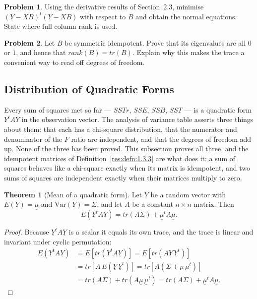 \documentclass[11pt,a4paper]{article}
\theoremstyle{definition}
\newtheorem{thm}{Theorem}[subsection]
\newtheorem{problemx}{Problem}[section]
\newenvironment{problem}{\begin{problemx}}{\end{problemx}}
\begin{document}
\begin{problem}
Using the derivative results of Section~2.3, minimise
$\left(\underline{Y}-XB\right)^t\left(\underline{Y}-XB\right)$ with respect to
$B$ and obtain the normal equations. State where full column rank is used.
\end{problem}

\begin{problem}
Let $B$ be symmetric idempotent. Prove that its eigenvalues are all $0$ or
$1$, and hence that $rank(B)=tr(B)$. Explain why this makes the trace a
convenient way to read off degrees of freedom.
\end{problem}

\subsection{Distribution of Quadratic Forms}

Every sum of squares met so far --- $SSTr$, $SSE$, $SSB$, $SST$ --- is a
quadratic form $Y^tAY$ in the observation vector. The analysis of variance
table asserts three things about them: that each has a chi-square
distribution, that the numerator and denominator of the $F$ ratio are
independent, and that the degrees of freedom add up. None of the three has
been proved. This subsection proves all three, and the idempotent matrices of
Definition~\ref{res:defn:1.3.3} are what does it: a sum of squares behaves like
a chi-square exactly when its matrix is idempotent, and two sums of squares are
independent exactly when their matrices multiply to zero.

\begin{thm}[Mean of a quadratic form]
\label{res:thm:qfmean}
Let $\underline{Y}$ be a random vector with $E\left(\underline{Y}\right)
=\underline{\mu}$ and $\text{Var}\left(\underline{Y}\right)=\Sigma$, and let
$A$ be a constant $n\times n$ matrix. Then
$$E\left(\underline{Y}^tA\underline{Y}\right)
= tr\left(A\Sigma\right) + \underline{\mu}^tA\underline{\mu}.$$
\end{thm}

\begin{proof}
Because $\underline{Y}^tA\underline{Y}$ is a scalar it equals its own trace,
and the trace is linear and invariant under cyclic permutation:
\begin{align*}
E\left(\underline{Y}^tA\underline{Y}\right)
& = E\left[tr\left(\underline{Y}^tA\underline{Y}\right)\right]
  = E\left[tr\left(A\underline{Y}\,\underline{Y}^t\right)\right]\\
& = tr\left[A\,E\left(\underline{Y}\,\underline{Y}^t\right)\right]
  = tr\left[A\left(\Sigma+\underline{\mu}\,\underline{\mu}^t\right)\right]\\
& = tr\left(A\Sigma\right)+tr\left(A\underline{\mu}\,\underline{\mu}^t\right)
  = tr\left(A\Sigma\right)+\underline{\mu}^tA\underline{\mu}.
\end{align*}
\end{proof}
\end{document}
